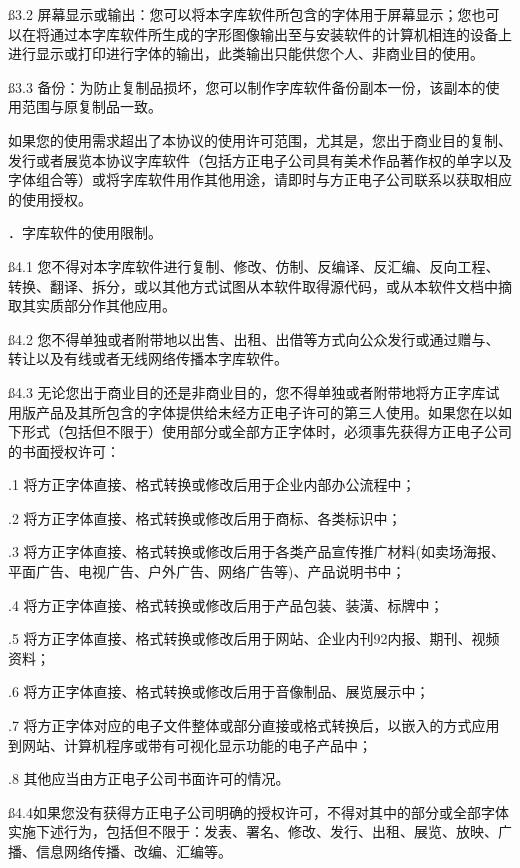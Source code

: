 \ss 3.2 屏幕显示或输出：您可以将本字库软件所包含的字体用于屏幕显示；您也可以在将通过本字库软件所生成的字形图像输出至与安装软件的计算机相连的设备上进行显示或打印进行字体的输出，此类输出只能供您个人、非商业目的使用。\par
\ss 3.3 备份：为防止复制品损坏，您可以制作字库软件备份副本一份，该副本的使用范围与原复制品一致。\par
\ssss 如果您的使用需求超出了本协议的使用许可范围，尤其是，您出于商业目的复制、发行或者展览本协议字库软件（包括方正电子公司具有美术作品著作权的单字以及字体组合等）或将字库软件用作其他用途，请即时与方正电子公司联系以获取相应的使用授权。\par
{}．字库软件的使用限制。\par
\ss 4.1 您不得对本字库软件进行复制、修改、仿制、反编译、反汇编、反向工程、转换、翻译、拆分，或以其他方式试图从本软件取得源代码，或从本软件文档中摘取其实质部分作其他应用。\par
\ss 4.2 您不得单独或者附带地以出售、出租、出借等方式向公众发行或通过赠与、转让以及有线或者无线网络传播本字库软件。\par
\ss 4.3 无论您出于商业目的还是非商业目的，您不得单独或者附带地将方正字库试用版产品及其所包含的字体提供给未经方正电子许可的第三人使用。如果您在以如下形式（包括但不限于）使用部分或全部方正字体时，必须事先获得方正电子公司的书面授权许可：\par
{}.1 将方正字体直接、格式转换或修改后用于企业内部办公流程中；\par
{}.2 将方正字体直接、格式转换或修改后用于商标、各类标识中；\par
{}.3 将方正字体直接、格式转换或修改后用于各类产品宣传推广材料(如卖场海报、平面广告、电视广告、户外广告、网络广告等)、产品说明书中；\par
{}.4 将方正字体直接、格式转换或修改后用于产品包装、装潢、标牌中；\par
{}.5 将方正字体直接、格式转换或修改后用于网站、企业内刊\char92内报、期刊、视频资料；\par
{}.6 将方正字体直接、格式转换或修改后用于音像制品、展览展示中；\par
{}.7 将方正字体对应的电子文件整体或部分直接或格式转换后，以嵌入的方式应用到网站、计算机程序或带有可视化显示功能的电子产品中；\par
{}.8 其他应当由方正电子公司书面许可的情况。\par
\ss 4.4如果您没有获得方正电子公司明确的授权许可，不得对其中的部分或全部字体实施下述行为，包括但不限于：发表、署名、修改、发行、出租、展览、放映、广播、信息网络传播、改编、汇编等。\par
